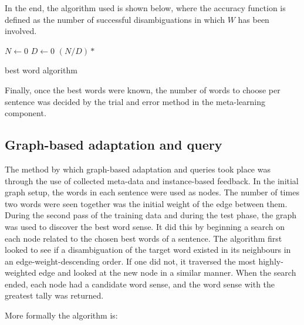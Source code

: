 In the end, the algorithm used is shown below, where the accuracy function is defined as the number of
successful disambiguations in which $W$ has been involved.

\IncMargin{1em}
\begin{algorithm}
\DontPrintSemicolon
{}
\BlankLine
	$N \longleftarrow 0$\;
	$D \longleftarrow 0$\;
	\Return $(N / D) *$ \;
\caption{best word algorithm \label{ALG_BESTWORDS}}
\end{algorithm}\DecMargin{1em}

Finally, once the best words were known, the number of words to choose per
sentence was decided by the trial and error method in the meta-learning component.

\subsection{Graph-based adaptation and query}

The method by which graph-based adaptation and queries took place was through the use of
collected meta-data and instance-based feedback.  In the initial graph
setup, the words in each sentence were used as nodes. The number of times two words 
were seen together was the initial weight of the edge between them. During the second pass 
of the training data and during the test phase, the graph was used to discover the best 
word sense. It did this by beginning a search on each node related to the chosen 
best words of a sentence. The algorithm first looked to see if a disambiguation 
of the target word existed in its neighbours in an edge-weight-descending order. 
If one did not, it traversed the most highly-weighted edge and looked at the new node 
in a similar manner.  When the search ended, each node had a candidate 
word sense, and the word sense with the greatest tally was returned.

More formally the algorithm is:


